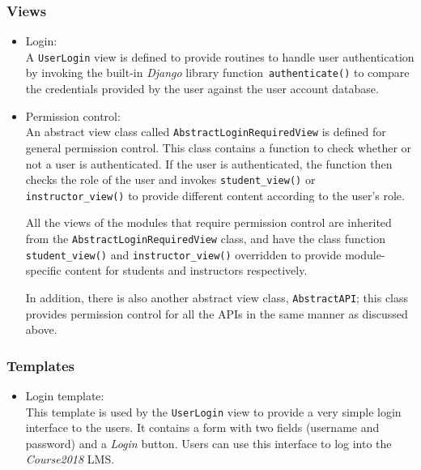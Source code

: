 \subsubsection{Views}

\begin{itemize}
    \item Login: \\
        A \texttt{UserLogin} view is defined to provide routines to handle user
        authentication by invoking the built-in \emph{Django} library
        function~\texttt{authenticate()}
        to compare the credentials provided
        by the user against the user account database.

    \item Permission control: \\
        An abstract view class called \texttt{AbstractLoginRequiredView} is
        defined for general permission control. This class contains a function
        to check whether or not a user is authenticated. If the user is
        authenticated, the function then checks the role of the user and
        invokes \texttt{student\_view()} or \texttt{instructor\_view()} to
        provide different content according to the user's role.

        All the views of the modules that require permission control are
        inherited from the \texttt{AbstractLoginRequiredView} class, and have
        the class function \texttt{student\_\-view()} and
        \texttt{instructor\_view()} overridden to provide module-specific
        content for students and instructors respectively.

        In addition, there is also another abstract view class,
        \texttt{AbstractAPI}; this class provides permission
        control for all the APIs in the same manner as discussed above.
\end{itemize}

\subsubsection{Templates}

\begin{itemize}
    \item Login template: \\
        This template is used by the \texttt{UserLogin} view to provide a very
        simple login interface to the users. It contains a form with two
        fields (username and password) and a \emph{Login} button. Users can
        use this interface to log into the \emph{Course2018} LMS.
\end{itemize}


